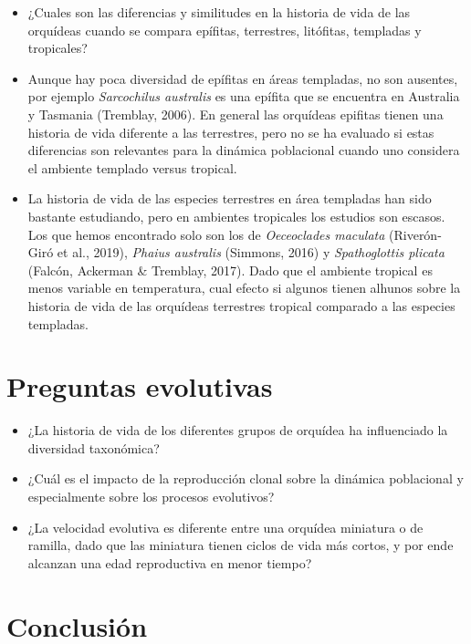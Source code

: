 \documentclass[
  12pt,
  letterpaper,
]{book}
\begin{document}
\begin{itemize}
\item
  ¿Cuales son las diferencias y similitudes en la historia de vida de
  las orquídeas cuando se compara epífitas, terrestres, litófitas,
  templadas y tropicales?
\item
  Aunque hay poca diversidad de epífitas en áreas templadas, no son
  ausentes, por ejemplo \emph{Sarcochilus australis} es una epífita que
  se encuentra en Australia y Tasmania (Tremblay, 2006). En general las
  orquídeas epifitas tienen una historia de vida diferente a las
  terrestres, pero no se ha evaluado si estas diferencias son relevantes
  para la dinámica poblacional cuando uno considera el ambiente templado
  versus tropical.
\item
  La historia de vida de las especies terrestres en área templadas han
  sido bastante estudiando, pero en ambientes tropicales los estudios
  son escasos. Los que hemos encontrado solo son los de
  \emph{Oeceoclades maculata} (Riverón-Giró et al., 2019), \emph{Phaius
  australis} (Simmons, 2016) y \emph{Spathoglottis plicata} (Falcón,
  Ackerman \& Tremblay, 2017). Dado que el ambiente tropical es menos
  variable en temperatura, cual efecto si algunos tienen alhunos sobre
  la historia de vida de las orquídeas terrestres tropical comparado a
  las especies templadas.
\end{itemize}

\chapter{Preguntas evolutivas}\label{preguntas-evolutivas}

\begin{itemize}
\item
  ¿La historia de vida de los diferentes grupos de orquídea ha
  influenciado la diversidad taxonómica?
\item
  ¿Cuál es el impacto de la reproducción clonal sobre la dinámica
  poblacional y especialmente sobre los procesos evolutivos?
\item
  ¿La velocidad evolutiva es diferente entre una orquídea miniatura o de
  ramilla, dado que las miniatura tienen ciclos de vida más cortos, y
  por ende alcanzan una edad reproductiva en menor tiempo?
\end{itemize}

\chapter{Conclusión}\label{conclusiuxf3n}
\end{document}
